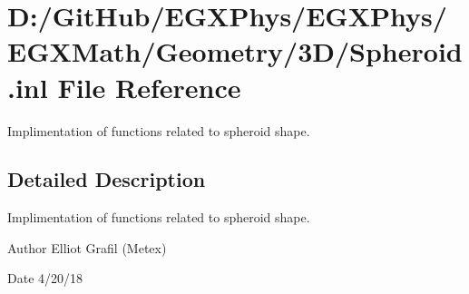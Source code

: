 \hypertarget{_spheroid_8inl}{}\section{D\+:/\+Git\+Hub/\+E\+G\+X\+Phys/\+E\+G\+X\+Phys/\+E\+G\+X\+Math/\+Geometry/3\+D/\+Spheroid.inl File Reference}
\label{_spheroid_8inl}


Implimentation of functions related to spheroid shape.  




\subsection{Detailed Description}
Implimentation of functions related to spheroid shape. 

\begin{DoxyAuthor}{Author}
Elliot Grafil (Metex) 
\end{DoxyAuthor}
\begin{DoxyDate}{Date}
4/20/18 
\end{DoxyDate}
